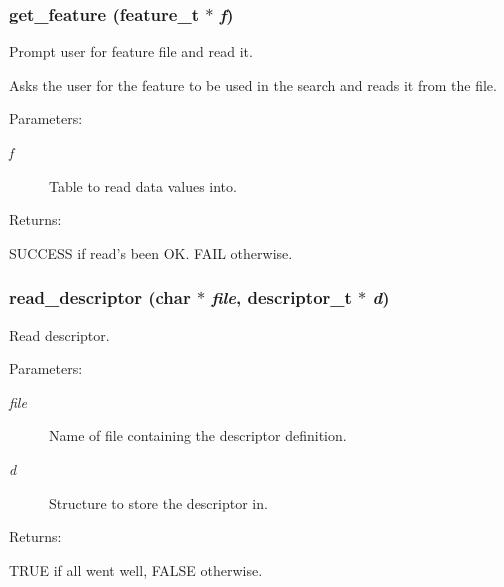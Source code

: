 \subsubsection{ get\_\-feature ({\bf feature\_\-t} $\ast$ {\em f})}\label{P__desc_8h_a1}


Prompt user for feature file and read it.



 Asks the user for the feature to be used in the search and reads it from the file.\begin{Desc}
\item[Parameters: ]\par
\begin{description}
\item[{\em 
f}]Table to read data values into.\end{description}
\end{Desc}
\begin{Desc}
\item[Returns: ]\par
SUCCESS if read's been OK. FAIL otherwise. \end{Desc}
\subsubsection{ read\_\-descriptor (char $\ast$ {\em file}, {\bf descriptor\_\-t} $\ast$ {\em d})}\label{P__desc_8h_a3}


Read descriptor.



 \begin{Desc}
\item[Parameters: ]\par
\begin{description}
\item[{\em 
file}]Name of file containing the descriptor definition. \item[{\em 
d}]Structure to store the descriptor in.\end{description}
\end{Desc}
\begin{Desc}
\item[Returns: ]\par
TRUE if all went well, FALSE otherwise. \end{Desc}
